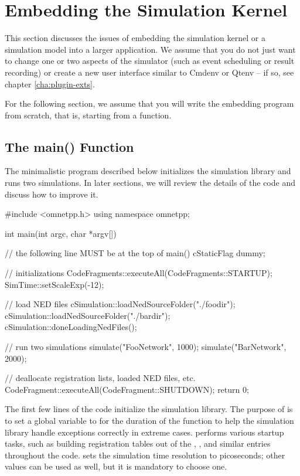 \section{Embedding the {\opp} Simulation Kernel}
\label{sec:embedding:embedding}

This section discusses the issues of embedding the simulation kernel
or a simulation model into a larger application. We assume that you
do not just want to change one or two aspects of the simulator
(such as event scheduling or result recording) or create a new user interface
similar to Cmdenv or Qtenv -- if so, see chapter \ref{cha:plugin-exts}.

For the following section, we assume that you will write the embedding
program from scratch, that is, starting from a  function.

\subsection{The main() Function}
\label{sec:embedding:main-function}

The minimalistic program described below initializes the simulation library
and runs two simulations. In later sections, we will review the details
of the code and discuss how to improve it.

\begin{cpp}
#include <omnetpp.h>
using namespace omnetpp;

int main(int argc, char *argv[])
{
    // the following line MUST be at the top of main()
    cStaticFlag dummy;

    // initializations
    CodeFragments::executeAll(CodeFragments::STARTUP);
    SimTime::setScaleExp(-12);

    // load NED files
    cSimulation::loadNedSourceFolder("./foodir");
    cSimulation::loadNedSourceFolder("./bardir");
    cSimulation::doneLoadingNedFiles();

    // run two simulations
    simulate("FooNetwork", 1000);
    simulate("BarNetwork", 2000);

    // deallocate registration lists, loaded NED files, etc.
    CodeFragment::executeAll(CodeFragment::SHUTDOWN);
    return 0;
}
\end{cpp}

The first few lines of the code initialize the simulation library. The
purpose of  is to set a global variable to 
for the duration of the  function to help the simulation
library handle exceptions correctly in extreme cases.
 performs various startup
tasks, such as building registration tables out of the ,
, and similar entries throughout the code.
 sets the simulation time resolution to
picoseconds; other values can be used as well, but it is mandatory to
choose one.

